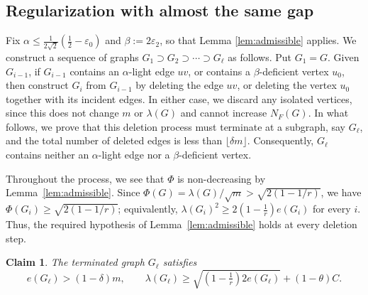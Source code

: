 \documentclass[11pt,a4paper]{article}
\newtheorem{claim}[theorem]{Claim}
\theoremstyle{definition}
\theoremstyle{plain}
\newcommand{\eps}{\varepsilon}
\renewcommand{\le}{\leqslant}
\renewcommand{\ge}{\geqslant}
\begin{document}
\subsection{Regularization with almost the same gap}

\label{sec:regularization}

Fix $\alpha \le \frac{1}{2\sqrt{2}}(\frac{1}{2} - \eps_0)$ and $\beta :=2 \eps_2$, so that Lemma \ref{lem:admissible}  applies. 
We  construct a sequence of graphs $ G_1 \supset G_2 \supset\cdots\supset
  G_{\ell}$ 
as follows. Put $G_1=G$. Given $G_{i-1}$, if $G_{i-1}$ contains an $\alpha$-light edge $uv$, or contains a $\beta$-deficient vertex $u_0$, 
then construct $G_i$ from $G_{i-1}$ 
by deleting the edge $uv$, or deleting the vertex $u_0$  together with its incident edges. 
In either case, we discard any isolated vertices, since this does not change $m$ or $\lambda(G)$ and cannot increase $N_F(G)$.  
In what follows, we prove that this deletion process must terminate at a subgraph, say $G_{\ell}$, and 
the total number of deleted edges is less than 
$\lfloor\delta m\rfloor$. Consequently, $G_{\ell}$ contains neither an $\alpha$-light edge nor a $\beta$-deficient vertex.  


Throughout the process, we see that $\Phi$ is non-decreasing by 
Lemma~\ref{lem:admissible}. Since
$\Phi(G)=\lambda(G)/\sqrt m>\sqrt{2(1-1/r)}$, we have
$\Phi(G_i)\ge\sqrt{2(1-1/r)}$; equivalently, 
$\lambda(G_i)^2\ge2(1-\frac1r)e(G_i)$ for every $i$.
Thus, the required hypothesis of
Lemma~\ref{lem:admissible} holds at every deletion step.



\begin{claim} \label{clm:regularization}
The terminated graph $G_{\ell}$ 
satisfies 
\begin{equation}\label{eq:surviving-gap}
  e(G_{\ell})>(1-\delta)m,
  \qquad 
  \lambda(G_{\ell})\ge  \sqrt{\left(1- \tfrac{1}{r}\right) 2e(G_{\ell})}+(1-\theta)C.
\end{equation}
\end{claim}
\end{document}
